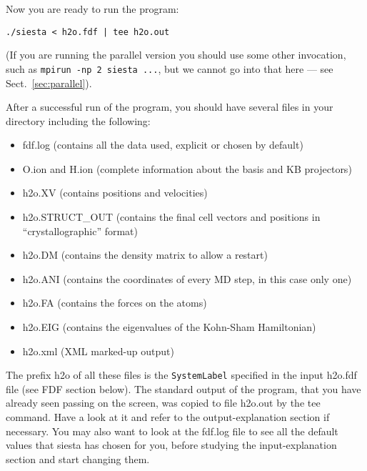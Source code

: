 \documentclass[11pt]{article}
\begin{document}
\noindent
Now you are ready to run the program:

{\tt ./siesta < h2o.fdf | tee h2o.out}

\noindent
(If you are running the parallel version you should use some other
invocation, such as {\tt mpirun -np 2 siesta ...}, but we cannot
go into that here --- see Sect.~\ref{sec:parallel}).

After a successful run of the program, you should have several
files in your directory including the following:
\begin{itemize}

\item fdf.log
 (contains all the data used, explicit or chosen by default)
\item O.ion and H.ion
 (complete information about the basis and KB projectors)
\item h2o.XV
 (contains positions and velocities)
\item h2o.STRUCT\_OUT
 (contains the final cell vectors and positions in
 ``crystallographic'' format)
\item h2o.DM
 (contains the density matrix to allow a restart)
\item h2o.ANI
 (contains the coordinates of every MD step, in this case only one)
\item h2o.FA
 (contains the forces on the atoms)
\item h2o.EIG
 (contains the eigenvalues of the Kohn-Sham Hamiltonian)
\item h2o.xml
 (XML marked-up output)
\end{itemize}

The prefix h2o of all these files is the 
{\tt SystemLabel}
specified in the input h2o.fdf file (see FDF section below).
The standard output of the program, that you
have already seen passing on the screen, was copied to
file h2o.out by the tee command. Have a look at it
and refer to the output-explanation section if necessary.
You may also want to look at the fdf.log file to see all
the default values that siesta has chosen for you, before
studying the input-explanation section and start changing them.
\end{document}
